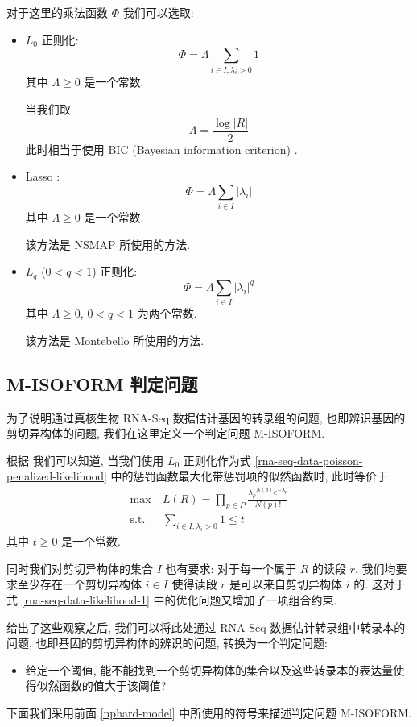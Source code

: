 对于这里的乘法函数 $\Phi$ 我们可以选取: 
\begin{itemize}
\item $L_0$ 正则化:
\[
\Phi = \Lambda \sum_{i \in I, \lambda_i >0} 1
\]
其中 $\Lambda \geq 0$ 是一个常数. 

当我们取 
\[
\Lambda = \frac{\log |R|}{2}
\]
此时相当于使用 BIC (Bayesian information criterion) \cite{BIC.Schwarz_1978}. 

\item Lasso \cite{tibshirani1996regression}:
\[
\Phi = \Lambda \sum_{i \in I} |\lambda_i|
\]
其中 $\Lambda \geq 0$ 是一个常数. 

该方法是 NSMAP \cite{nsmap.21575225} 所使用的方法. 

\item $L_q$ ($0<q<1$) 正则化:
\[
\Phi = \Lambda \sum_{i \in I} |\lambda_i|^q
\]
其中 $\Lambda \geq 0$, $0 <q<1$ 为两个常数. 

该方法是 Montebello \cite{Hiller.Montebello} 所使用的方法. 
\end{itemize}

\subsection{M-ISOFORM 判定问题}
为了说明通过真核生物 RNA-Seq 数据估计基因的转录组的问题, 
也即辨识基因的剪切异构体的问题, 我们在这里定义一个判定问题 M-ISOFORM. 

根据  我们可以知道, 
当我们使用 $L_0$ 正则化作为式 \eqref{rna-seq-data-poisson-penalized-likelihood} 
中的惩罚函数最大化带惩罚项的似然函数时, 此时等价于
\begin{align}
\max &\ L(R) =  \prod_{p\in P} \frac{{\lambda_p}^{N(p)} e^{-\lambda_p}}{N(p)!} \nonumber \\
\label{rna-seq-data-likelihood-1}
\text{s.t.} &\  \sum_{i \in I, \lambda_i>0} 1 \leq t
\end{align}
其中 $t\geq 0$ 是一个常数. 


同时我们对剪切异构体的集合 $I$ 也有要求: 对于每一个属于 $R$ 的读段 $r$, 
我们均要求至少存在一个剪切异构体 $i \in I$ 使得读段 $r$ 是可以来自剪切异构体 $i$ 的. 
这对于式 \ref{rna-seq-data-likelihood-1} 中的优化问题又增加了一项组合约束. 

给出了这些观察之后, 我们可以将此处通过 RNA-Seq 数据估计转录组中转录本的问题, 
也即基因的剪切异构体的辨识的问题, 转换为一个判定问题:
\begin{itemize}
\item 给定一个阈值, 
能不能找到一个剪切异构体的集合以及这些转录本的表达量使得似然函数的值大于该阈值?
\end{itemize}
下面我们采用前面 \ref{nphard-model} 中所使用的符号来描述判定问题 M-ISOFORM. 

